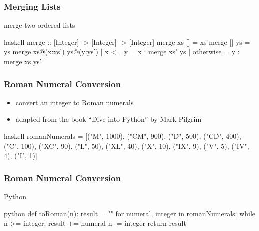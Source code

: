 \documentclass[dvipsnames]{beamer}
\theoremstyle{plain}
\begin{document}
\begin{frame}[fragile]
  \frametitle{Merging Lists}

  \begin{exampleblock}{merge two ordered lists}
    \begin{pygments}{haskell}
merge :: [Integer] -> [Integer] -> [Integer]
merge xs     []             = xs
merge []     ys             = ys
merge xs@(x:xs') ys@(y:ys')
  | x <= y    = x : merge xs' ys
  | otherwise = y : merge xs  ys'
    \end{pygments}
  \end{exampleblock}
\end{frame}

\begin{frame}[fragile]
  \frametitle{Roman Numeral Conversion}

  \begin{itemize}
    \item convert an integer to Roman numerals
    \item adapted from the book ``Dive into Python'' by Mark Pilgrim
  \end{itemize}

  \begin{exampleblock}{}
    \begin{pygments}{haskell}
romanNumerals =
  [("M", 1000), ("CM", 900), ("D", 500), ("CD", 400),
   ("C",  100), ("XC",  90), ("L",  50), ("XL",  40),
   ("X",   10), ("IX",   9), ("V",   5), ("IV",   4),
   ("I",    1)]
    \end{pygments}
  \end{exampleblock}
\end{frame}

\begin{frame}[fragile]
  \frametitle{Roman Numeral Conversion}

  \begin{exampleblock}{Python}
    \begin{pygments}{python}
def toRoman(n):
    result = ""
    for numeral, integer in romanNumerals:
        while n >= integer:
            result += numeral
            n -= integer
    return result
    \end{pygments}
  \end{exampleblock}
\end{frame}
\end{document}
